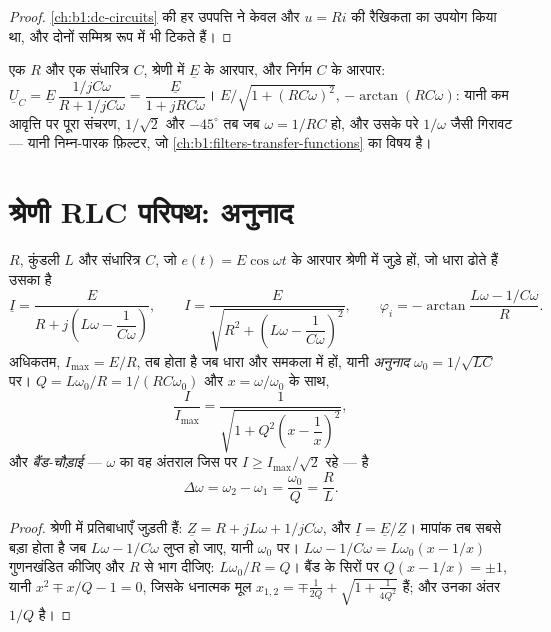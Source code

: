 \begin{proof}
\cref{ch:b1:dc-circuits} की हर उपपत्ति ने केवल  और
$u = Ri$ की रैखिकता का उपयोग किया था, और दोनों सम्मिश्र रूप में भी टिकते हैं।
\end{proof}

\begin{example}[RC विभाजक]\label{ex:b1:sinusoidal-impedance:rcdivider}
एक  $R$ और एक संधारित्र $C$, श्रेणी में $\underline E$ के आरपार, और
निर्गम $C$ के आरपार: $\underline U_C = \underline E\,\dfrac{1/jC\omega}
{R + 1/jC\omega} = \dfrac{\underline E}{1 + jRC\omega}$। 
$E/\sqrt{1 + (RC\omega)^2}$,  $-\arctan(RC\omega)$: यानी कम आवृत्ति पर
पूरा संचरण, $1/\sqrt2$ और $-45^\circ$ तब जब $\omega = 1/RC$ हो,
और उसके परे $1/\omega$ जैसी गिरावट --- यानी निम्न-पारक फ़िल्टर, जो
\cref{ch:b1:filters-transfer-functions} का विषय है।
\end{example}

\section{श्रेणी RLC परिपथ: अनुनाद}

\begin{theorem}[धारा का अनुनाद]\label{thm:b1:sinusoidal-impedance:resonance}
 $R$, कुंडली $L$ और संधारित्र $C$, जो $e(t) = E\cos\omega t$ के
आरपार श्रेणी में जुड़े हों, जो धारा ढोते हैं उसका  है
\[
\underline I = \frac{E}{R + j\left(L\omega - \dfrac{1}{C\omega}\right)},
\qquad
I = \frac{E}{\sqrt{R^2 + \left(L\omega - \dfrac{1}{C\omega}\right)^2}},
\qquad
\varphi_i = -\arctan\frac{L\omega - 1/C\omega}{R} .
\]
 अधिकतम, $I_{\max} = E/R$, तब होता है जब धारा और  समकला में हों,
यानी \emph{अनुनाद} $\omega_0 = 1/\sqrt{LC}$ पर।
$Q = L\omega_0/R = 1/(RC\omega_0)$ और $x = \omega/\omega_0$ के साथ,
\[
\frac{I}{I_{\max}} = \frac{1}{\sqrt{1 + Q^2\left(x - \dfrac1x\right)^2}} ,
\]
और \emph{बैंड-चौड़ाई} --- $\omega$ का वह अंतराल जिस पर
$I \geq I_{\max}/\sqrt2$ रहे --- है
\[
\Delta\omega = \omega_2 - \omega_1 = \frac{\omega_0}{Q} = \frac{R}{L} .
\]
\end{theorem}

\begin{proof}
श्रेणी में प्रतिबाधाएँ जुड़ती हैं: $\underline Z = R + jL\omega + 1/jC\omega$, और
$\underline I = \underline E/\underline Z$। मापांक तब सबसे बड़ा होता है जब
 $L\omega - 1/C\omega$ लुप्त हो जाए, यानी $\omega_0$ पर।
$L\omega - 1/C\omega = L\omega_0(x - 1/x)$ गुणनखंडित कीजिए और $R$ से भाग दीजिए:
$L\omega_0/R = Q$। बैंड के सिरों पर $Q(x - 1/x) = \pm 1$, यानी
$x^2 \mp x/Q - 1 = 0$, जिसके धनात्मक मूल $x_{1,2} = \mp\frac{1}{2Q}
+ \sqrt{1 + \frac{1}{4Q^2}}$ हैं; और उनका अंतर $1/Q$ है।
\end{proof}

